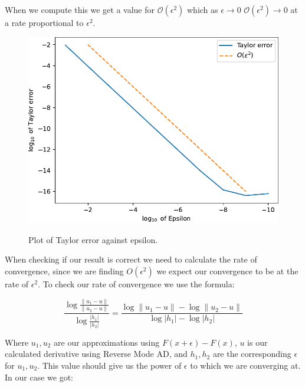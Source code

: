 \documentclass{article}
\begin{document}
When we compute this we get a value for $\mathcal{O}(\epsilon^2)$ which as $\epsilon \longrightarrow 0$ $\mathcal{O}(\epsilon^2) \to 0$ at a rate proportional to $\epsilon^2$.

\begin{figure}[h!]
    \cite{finite}
    \includegraphics[width=12cm]{images/taylor_error_1.pdf}
    \caption{Plot of Taylor error against epsilon.}
    \label{fig:taylorerror}
\end{figure}

When checking if our result is correct we need to calculate the rate of convergence, since we are finding $O(\epsilon^2)$ we expect our convergence to be at the rate of $\epsilon^2$. To check our rate of convergence we use the formula:

\begin{equation}
    \frac{\log{\frac{\|u_1 - u\|}{\|u_2 - u\|}}}{\log{\frac{|h_1|}{|h_2|}}} = \frac{\log\|u_1 - u\| - \log\|u_2 - u\|}{\log|h_1| - \log|h_2|}
\end{equation}

Where $u_1, u_2$ are our approximations using $F(x + \epsilon) - F(x)$, $u$ is our calculated derivative using Reverse Mode AD, and $h_1, h_2$ are the corresponding $\epsilon$ for $u_1, u_2$. This value should give us the power of $\epsilon$ to which we are converging at. In our case we got:

\begin{center}
\end{center}
\end{document}
